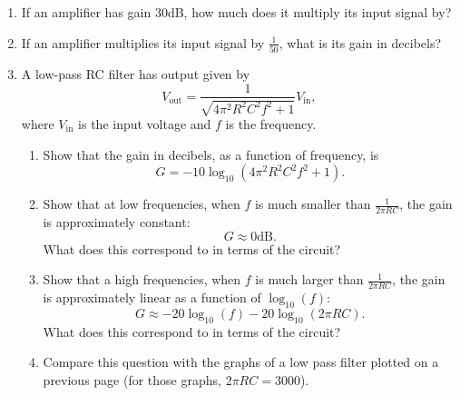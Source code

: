 \documentclass{article}
\begin{document}
\begin{enumerate}
	\item If an amplifier has gain 30dB, how much does it multiply its input signal by?
	\item If an amplifier multiplies its input signal by $\frac{1}{50}$, what is its gain in decibels?
	\item A low-pass RC filter has output given by
		\[V_\mathrm{out}=\frac{1}{\sqrt{4\pi^2R^2C^2 f^2 +1}}V_\mathrm{in},\]
		where $V_\mathrm{in}$ is the input voltage and $f$ is the frequency.
		\begin{enumerate}
			\item Show that the gain in decibels, as a function of frequency, is
				\[G=-10\log_{10}\left(4\pi^2R^2C^2f^2+1\right).\]
			\item Show that at low frequencies, when $f$ is much smaller than $\frac{1}{2\pi RC}$, the gain is approximately constant:
				\[G\approx 0\mathrm{dB}.\]
				What does this correspond to in terms of the circuit?
			\item Show that a high frequencies, when $f$ is much larger than $\frac{1}{2\pi RC}$, the gain is approximately linear as a function of $\log_{10}(f)$:
				\[G\approx -20\log_{10}(f) - 20\log_{10}(2\pi RC).\]
				What does this correspond to in terms of the circuit?
			\item Compare this question with the graphs of a low pass filter plotted on a previous page (for those graphs, $2\pi RC=3000$).
		\end{enumerate}
\end{enumerate}
\end{document}
